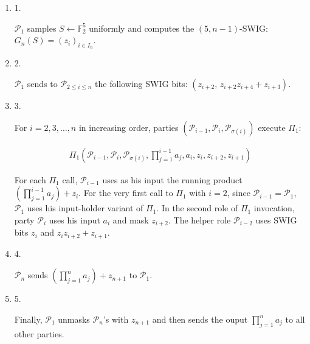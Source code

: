 \begin{enumerate}


\item[] 
1. 


$\mathcal{P}_{1}$ samples $S\leftarrow\mathbb{F}_{2}^{5}$ uniformly and computes the $(5,n-1)$-SWIG: $G_{n}(S)=(z_{i})_{i\in I_{n}}$.\par





\item[] 
2. 


$\mathcal{P}_{1}$ sends to $\mathcal{P}_{2\leq i\leq n}$ the following SWIG bits: $(z_{i+2},\,z_{i+2}z_{i+4}+z_{i+3})$.\par





\item[] 
3. 


For $i=2,3,\dots,n$ in increasing order, parties $(\mathcal{P}_{i-1},\mathcal{P}_{i},\mathcal{P}_{\sigma(i)})$ execute $\Pi_{1}$:\par


\[\begin{gathered}
\Pi_{1}\!\left(\mathcal{P}_{i-1},\mathcal{P}_{i},\mathcal{P}_{\sigma(i)},\prod_{j=1}^{i-1}a_{j},a_{i},z_{i},z_{i+2},z_{i+1}\right)
\end{gathered}\]


For each $\Pi_{1}$ call, $\mathcal{P}_{i-1}$ uses as his input the running product $(\prod_{j=1}^{i-1}a_{j})+z_{i}$. For the very first call to $\Pi_{1}$ with $i=2$, since $\mathcal{P}_{i-1}=\mathcal{P}_{1}$, $\mathcal{P}_{1}$ uses his input-holder variant of $\Pi_{1}$. In the second role of $\Pi_{1}$ invocation, party $\mathcal{P}_{i}$ uses his input $a_{i}$ and mask $z_{i+2}$. The helper role $\mathcal{P}_{i-2}$ uses SWIG bits $z_{i}$ and $z_{i}z_{i+2}+z_{i+1}$.\par





\item[] 
4. 


$\mathcal{P}_{n}$ sends $(\prod_{j=1}^{n}a_{j})+z_{n+1}$ to $\mathcal{P}_{1}$.\par





\item[] 
5. 


Finally, $\mathcal{P}_{1}$ unmasks $\mathcal{P}_{n}$’s with $z_{n+1}$ and then sends the ouput $\prod_{j=1}^{n}a_{j}$ to all other parties.\par





\end{enumerate}


